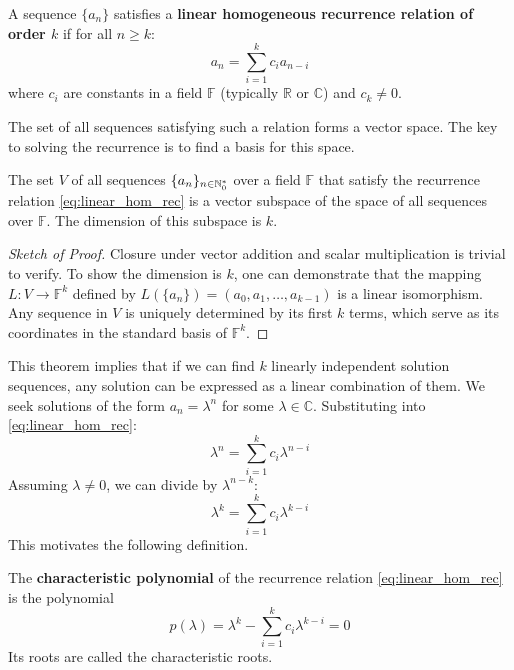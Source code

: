 \begin{definition}
A sequence $\{a_n\}$ satisfies a \textbf{linear homogeneous recurrence relation of order $k$} if for all $n \ge k$:
\begin{equation}\label{eq:linear_hom_rec}
a_n = \sum_{i=1}^{k} c_i a_{n-i}
\end{equation}
where $c_i$ are constants in a field $\mathbb{F}$ (typically $\mathbb{R}$ or $\mathbb{C}$) and $c_k \neq 0$.
\end{definition}

The set of all sequences satisfying such a relation forms a vector space. The key to solving the recurrence is to find a basis for this space.

\begin{theorem}
The set $V$ of all sequences $\{a_n\}_{n \in \mathbb{N}_{0}^*}$ over a field $\mathbb{F}$ that satisfy the recurrence relation \eqref{eq:linear_hom_rec} is a vector subspace of the space of all sequences over $\mathbb{F}$. The dimension of this subspace is $k$.
\end{theorem}
\begin{proof}[Sketch of Proof]
Closure under vector addition and scalar multiplication is trivial to verify. To show the dimension is $k$, one can demonstrate that the mapping $L: V \to \mathbb{F}^k$ defined by $L(\{a_n\}) = (a_0, a_1, \dots, a_{k-1})$ is a linear isomorphism. Any sequence in $V$ is uniquely determined by its first $k$ terms, which serve as its coordinates in the standard basis of $\mathbb{F}^k$.
\end{proof}

This theorem implies that if we can find $k$ linearly independent solution sequences, any solution can be expressed as a linear combination of them. We seek solutions of the form $a_n = \lambda^n$ for some $\lambda \in \mathbb{C}$. Substituting into \eqref{eq:linear_hom_rec}:
$$ \lambda^n = \sum_{i=1}^{k} c_i \lambda^{n-i} $$
Assuming $\lambda \neq 0$, we can divide by $\lambda^{n-k}$:
$$ \lambda^k = \sum_{i=1}^{k} c_i \lambda^{k-i} $$
This motivates the following definition.

\begin{definition}
The \textbf{characteristic polynomial} of the recurrence relation \eqref{eq:linear_hom_rec} is the polynomial
\begin{equation}\label{eq:char_poly}
p(\lambda) = \lambda^k - \sum_{i=1}^{k} c_i \lambda^{k-i} = 0
\end{equation}
Its roots are called the characteristic roots.
\end{definition}

